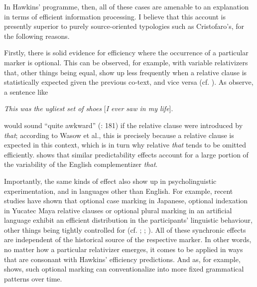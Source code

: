 \documentclass[output=paper]{langsci/langscibook}
\begin{document}
In Hawkins’ programme, then, all of these cases are amenable to an explanation in terms of efficient information processing. I believe that this account is presently superior to purely source-oriented typologies such as Cristofaro’s, for the following reasons.

Firstly, there is solid evidence for efficiency where the occurrence of a particular marker is optional. This can be observed, for example, with variable relativizers that, other things being equal, show up less frequently when a relative clause is statistically expected given the previous co-text, and vice versa (cf. \citealt{WasowEtAl2011}). As \citet{FoxThompson2007} observe, a sentence like

\ea
{\textit{This was the ugliest set of shoes} [\textit{I ever saw in my life}].} \\
\z

would sound “quite awkward” (\citealt{WasowEtAl2011}: 181) if the relative clause were introduced by \textit{that}; according to Wasow et al., this is precisely because a relative clause is expected in this context, which is in turn why relative \textit{that} tends to be omitted efficiently. \citet{Jaeger2010} shows that similar predictability effects account for a large portion of the variability of the English complementizer \textit{that}. 

Importantly, the same kinds of effect also show up in psycholinguistic experimentation, and in languages other than English. For example, recent studies have shown that optional case marking in Japanese, optional indexation in Yucatec Maya relative clauses or optional plural marking in an artificial language exhibit an efficient distribution in the participants’ linguistic behaviour, other things being tightly controlled for (cf. \citealt{KurumadaJaeger2015}; \citealt{NorcliffeJaeger2016}; \citealt{KurumadaGrimm2017}). All of these synchronic effects are independent of the historical source of the respective marker. In other words, no matter how a particular relativizer emerges, it comes to be applied in ways that are consonant with Hawkins’ efficiency predictions. And as, for example, \citet{Seržant2019 (this volume)} shows, such optional marking can conventionalize into more fixed grammatical patterns over time.
\end{document}
